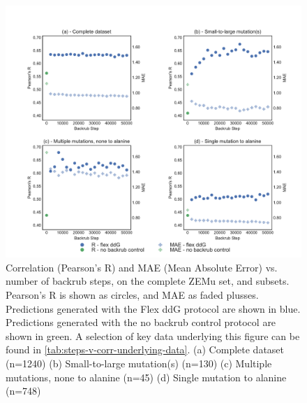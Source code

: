 \begin{figure}
  \includegraphics[width=\textwidth,keepaspectratio]{steps-v-corr.pdf}
  \caption[Flex ddG performance vs. number of backrub steps]{
    Correlation (Pearson's R) and MAE (Mean Absolute Error) vs. number of backrub steps, on the complete ZEMu set, and subsets.
    Pearson's R is shown as circles, and MAE as faded plusses.
Predictions generated with the Flex ddG protocol are shown in blue.
Predictions generated with the no backrub control protocol are shown in green.
    A selection of key data underlying this figure can be found in \cref{tab:steps-v-corr-underlying-data}.
    (a) Complete dataset (n=1240)
    (b) Small-to-large mutation(s) (n=130)
    (c) Multiple mutations, none to alanine (n=45)
    (d) Single mutation to alanine (n=748)
  } \label{fig:steps-v-corr}
\end{figure}
